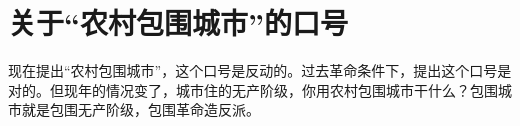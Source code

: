 \section[关于“农村包围城市”的口号（一九六七年七月）]{关于“农村包围城市”的口号}


现在提出“农村包围城市”，这个口号是反动的。过去革命条件下，提出这个口号是对的。但现年的情况变了，城市住的无产阶级，你用农村包围城市干什么？包围城市就是包围无产阶级，包围革命造反派。
